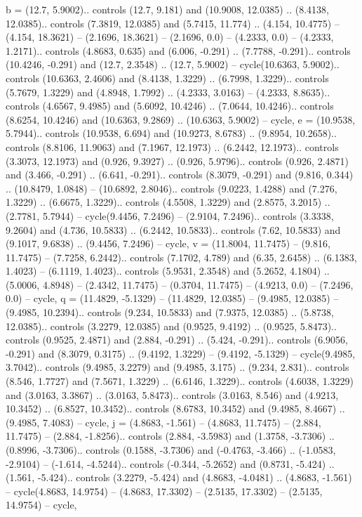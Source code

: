 {b} = {(12.7, 5.9002).. controls (12.7, 9.181) and (10.9008, 12.0385) .. (8.4138, 12.0385).. controls (7.3819, 12.0385) and (5.7415, 11.774) .. (4.154, 10.4775) -- (4.154, 18.3621) -- (2.1696, 18.3621) -- (2.1696, 0.0) -- (4.2333, 0.0) -- (4.2333, 1.2171).. controls (4.8683, 0.635) and (6.006, -0.291) .. (7.7788, -0.291).. controls (10.4246, -0.291) and (12.7, 2.3548) .. (12.7, 5.9002) -- cycle(10.6363, 5.9002).. controls (10.6363, 2.4606) and (8.4138, 1.3229) .. (6.7998, 1.3229).. controls (5.7679, 1.3229) and (4.8948, 1.7992) .. (4.2333, 3.0163) -- (4.2333, 8.8635).. controls (4.6567, 9.4985) and (5.6092, 10.4246) .. (7.0644, 10.4246).. controls (8.6254, 10.4246) and (10.6363, 9.2869) .. (10.6363, 5.9002) -- cycle},
{e} = {(10.9538, 5.7944).. controls (10.9538, 6.694) and (10.9273, 8.6783) .. (9.8954, 10.2658).. controls (8.8106, 11.9063) and (7.1967, 12.1973) .. (6.2442, 12.1973).. controls (3.3073, 12.1973) and (0.926, 9.3927) .. (0.926, 5.9796).. controls (0.926, 2.4871) and (3.466, -0.291) .. (6.641, -0.291).. controls (8.3079, -0.291) and (9.816, 0.344) .. (10.8479, 1.0848) -- (10.6892, 2.8046).. controls (9.0223, 1.4288) and (7.276, 1.3229) .. (6.6675, 1.3229).. controls (4.5508, 1.3229) and (2.8575, 3.2015) .. (2.7781, 5.7944) -- cycle(9.4456, 7.2496) -- (2.9104, 7.2496).. controls (3.3338, 9.2604) and (4.736, 10.5833) .. (6.2442, 10.5833).. controls (7.62, 10.5833) and (9.1017, 9.6838) .. (9.4456, 7.2496) -- cycle},
{v} = {(11.8004, 11.7475) -- (9.816, 11.7475) -- (7.7258, 6.2442).. controls (7.1702, 4.789) and (6.35, 2.6458) .. (6.1383, 1.4023) -- (6.1119, 1.4023).. controls (5.9531, 2.3548) and (5.2652, 4.1804) .. (5.0006, 4.8948) -- (2.4342, 11.7475) -- (0.3704, 11.7475) -- (4.9213, 0.0) -- (7.2496, 0.0) -- cycle},
{q} = {(11.4829, -5.1329) -- (11.4829, 12.0385) -- (9.4985, 12.0385) -- (9.4985, 10.2394).. controls (9.234, 10.5833) and (7.9375, 12.0385) .. (5.8738, 12.0385).. controls (3.2279, 12.0385) and (0.9525, 9.4192) .. (0.9525, 5.8473).. controls (0.9525, 2.4871) and (2.884, -0.291) .. (5.424, -0.291).. controls (6.9056, -0.291) and (8.3079, 0.3175) .. (9.4192, 1.3229) -- (9.4192, -5.1329) -- cycle(9.4985, 3.7042).. controls (9.4985, 3.2279) and (9.4985, 3.175) .. (9.234, 2.831).. controls (8.546, 1.7727) and (7.5671, 1.3229) .. (6.6146, 1.3229).. controls (4.6038, 1.3229) and (3.0163, 3.3867) .. (3.0163, 5.8473).. controls (3.0163, 8.546) and (4.9213, 10.3452) .. (6.8527, 10.3452).. controls (8.6783, 10.3452) and (9.4985, 8.4667) .. (9.4985, 7.4083) -- cycle},
{j} = {(4.8683, -1.561) -- (4.8683, 11.7475) -- (2.884, 11.7475) -- (2.884, -1.8256).. controls (2.884, -3.5983) and (1.3758, -3.7306) .. (0.8996, -3.7306).. controls (0.1588, -3.7306) and (-0.4763, -3.466) .. (-1.0583, -2.9104) -- (-1.614, -4.5244).. controls (-0.344, -5.2652) and (0.8731, -5.424) .. (1.561, -5.424).. controls (3.2279, -5.424) and (4.8683, -4.0481) .. (4.8683, -1.561) -- cycle(4.8683, 14.9754) -- (4.8683, 17.3302) -- (2.5135, 17.3302) -- (2.5135, 14.9754) -- cycle},
